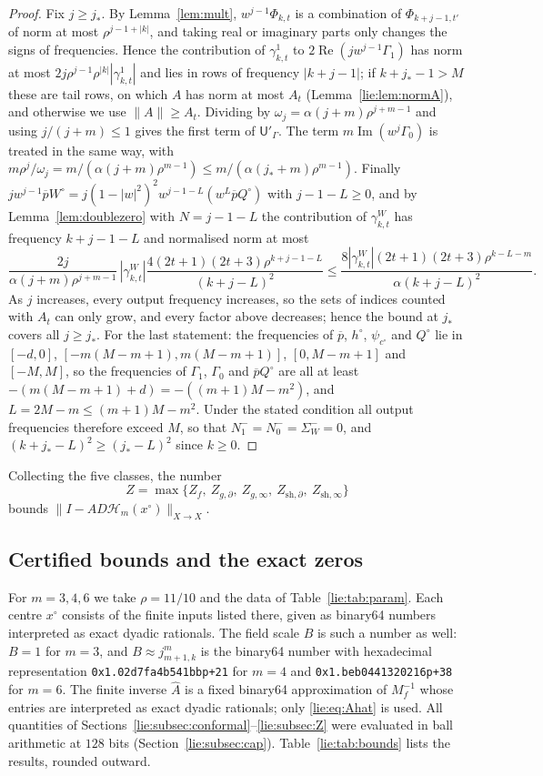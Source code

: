 \documentclass[11pt]{amsart}
\theoremstyle{definition}
\theoremstyle{remark}
\numberwithin{equation}{section}
\newcommand{\jst}{j_*}
\newcommand{\sU}{\mathsf{U}}
\DeclareMathOperator{\re}{Re}
\DeclareMathOperator{\im}{Im}
\newcommand{\nrm}[1]{\lVert #1\rVert}
\newcommand{\Hc}{\mathcal{H}}
\begin{document}
\begin{proof}
Fix $j\geq\jst$. By Lemma~\ref{lem:mult}, $w^{j-1}\Phi_{k,t}$ is a combination of $\Phi_{k+j-1,t'}$ of norm at most $\rho^{j-1+|k|}$, and taking real or imaginary parts only changes the signs of frequencies. Hence the contribution of $\gamma^1_{k,t}$ to $2\re(jw^{j-1}\Gamma_1)$ has norm at most $2j\rho^{j-1}\rho^{|k|}|\gamma^1_{k,t}|$ and lies in rows of frequency $|k+j-1|$; if $k+\jst-1>M$ these are tail rows, on which $A$ has norm at most $A_t$ (Lemma~\ref{lie:lem:normA}), and otherwise we use $\nrm A\geq A_t$. Dividing by $\omega_j=\alpha(j+m)\rho^{j+m-1}$ and using $j/(j+m)\leq1$ gives the first term of $\sU'_\Gamma$. The term $m\im(w^j\Gamma_0)$ is treated in the same way, with $m\rho^j/\omega_j=m/(\alpha(j+m)\rho^{m-1})\leq m/(\alpha(\jst+m)\rho^{m-1})$. Finally $jw^{j-1}\overline pW^\circ=j(1-|w|^2)^2w^{j-1-L}(w^L\overline pQ^\circ)$ with $j-1-L\geq0$, and by Lemma~\ref{lem:doublezero} with $N=j-1-L$ the contribution of $\gamma^W_{k,t}$ has frequency $k+j-1-L$ and normalised norm at most
\[
\frac{2j}{\alpha(j+m)\rho^{j+m-1}}\,|\gamma^W_{k,t}|\frac{4(2t+1)(2t+3)\rho^{k+j-1-L}}{(k+j-L)^2}\leq\frac{8|\gamma^W_{k,t}|(2t+1)(2t+3)\rho^{k-L-m}}{\alpha(k+j-L)^2}.
\]
As $j$ increases, every output frequency increases, so the sets of indices counted with $A_t$ can only grow, and every factor above decreases; hence the bound at $\jst$ covers all $j\geq\jst$. For the last statement: the frequencies of $\overline p$, $h^\circ$, $\psi_{c^\circ}$ and $Q^\circ$ lie in $[-d,0]$, $[-m(M-m+1),m(M-m+1)]$, $[0,M-m+1]$ and $[-M,M]$, so the frequencies of $\Gamma_1$, $\Gamma_0$ and $\overline pQ^\circ$ are all at least $-(m(M-m+1)+d)=-((m+1)M-m^2)$, and $L=2M-m\leq(m+1)M-m^2$. Under the stated condition all output frequencies therefore exceed $M$, so that $N_1^-=N_0^-=\Sigma_W^-=0$, and $(k+\jst-L)^2\geq(\jst-L)^2$ since $k\geq0$.
\end{proof}

Collecting the five classes, the number
\[
Z=\max\{Z_f,\ Z_{g,\partial},\ Z_{g,\infty},\ Z_{\mathrm{sh},\partial},\ Z_{\mathrm{sh},\infty}\}
\]
bounds $\nrm{I-AD\Hc_m(x^\circ)}_{X\to X}$.

\subsection{Certified bounds and the exact zeros}\label{lie:subsec:zero}

For $m=3,4,6$ we take $\rho=11/10$ and the data of Table~\ref{lie:tab:param}. Each centre $x^\circ$ consists of the finite inputs listed there, given as binary64 numbers interpreted as exact dyadic rationals. The field scale $B$ is such a number as well: $B=1$ for $m=3$, and $B\approx j_{m+1,k}^m$ is the binary64 number with hexadecimal representation \texttt{0x1.02d7fa4b541bbp+21} for $m=4$ and \texttt{0x1.beb0441320216p+38} for $m=6$. The finite inverse $\widehat A$ is a fixed binary64 approximation of $M_f^{-1}$ whose entries are interpreted as exact dyadic rationals; only \eqref{lie:eq:Ahat} is used. All quantities of Sections~\ref{lie:subsec:conformal}--\ref{lie:subsec:Z} were evaluated in ball arithmetic at $128$ bits (Section~\ref{lie:subsec:cap}). Table~\ref{lie:tab:bounds} lists the results, rounded outward.
\end{document}
